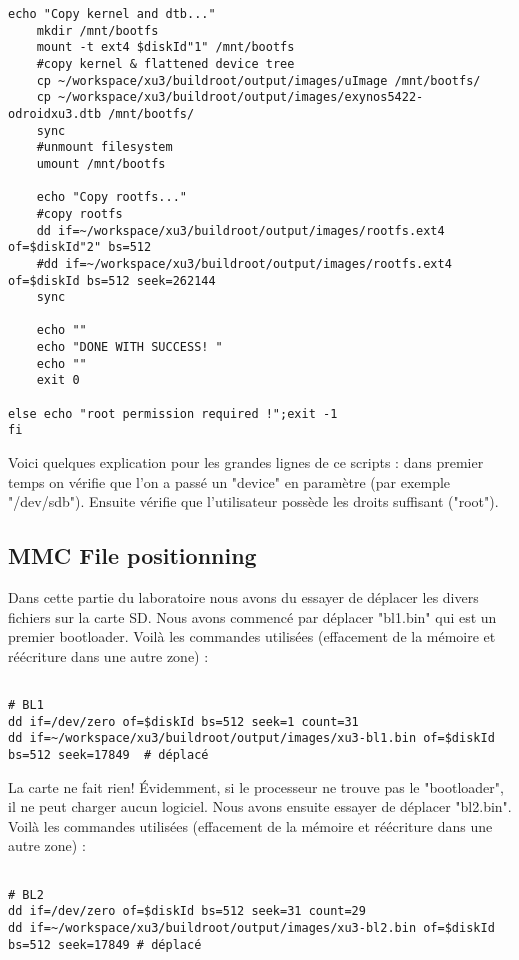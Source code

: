 \begin{lstlisting}[frame=single,style=Console]
	echo "Copy kernel and dtb..."
	mkdir /mnt/bootfs
	mount -t ext4 $diskId"1" /mnt/bootfs
	#copy kernel & flattened device tree
	cp ~/workspace/xu3/buildroot/output/images/uImage /mnt/bootfs/
	cp ~/workspace/xu3/buildroot/output/images/exynos5422-odroidxu3.dtb /mnt/bootfs/ 
	sync
	#unmount filesystem
	umount /mnt/bootfs

	echo "Copy rootfs..."
 	#copy rootfs
	dd if=~/workspace/xu3/buildroot/output/images/rootfs.ext4 of=$diskId"2" bs=512 
	#dd if=~/workspace/xu3/buildroot/output/images/rootfs.ext4 of=$diskId bs=512 seek=262144 
	sync

	echo ""
	echo "DONE WITH SUCCESS! "
	echo ""
	exit 0

else echo "root permission required !";exit -1
fi

\end{lstlisting}

Voici quelques explication pour les grandes lignes de ce scripts : dans premier temps on vérifie que l'on a passé un "device" en paramètre (par exemple "/dev/sdb"). Ensuite vérifie que l'utilisateur possède les droits suffisant ("root"). 

\pagebreak
\subsection{MMC File positionning}

Dans cette partie du laboratoire nous avons du essayer de déplacer les divers fichiers sur la carte SD. Nous avons commencé par déplacer "bl1.bin" qui est un premier bootloader. Voilà les commandes utilisées (effacement de la mémoire et réécriture dans une autre zone) :
\begin{lstlisting}[frame=single,style=Console]  % Start your code-block

# BL1
dd if=/dev/zero of=$diskId bs=512 seek=1 count=31
dd if=~/workspace/xu3/buildroot/output/images/xu3-bl1.bin of=$diskId bs=512 seek=17849  # déplacé
\end{lstlisting}

La carte ne fait rien! Évidemment, si le processeur ne trouve pas le "bootloader", il ne peut charger aucun logiciel. 
Nous avons ensuite essayer de déplacer "bl2.bin". Voilà les commandes utilisées (effacement de la mémoire et réécriture dans une autre zone) : 
\begin{lstlisting}[frame=single,style=Console]  % Start your code-block

# BL2
dd if=/dev/zero of=$diskId bs=512 seek=31 count=29
dd if=~/workspace/xu3/buildroot/output/images/xu3-bl2.bin of=$diskId bs=512 seek=17849 # déplacé
\end{lstlisting}

